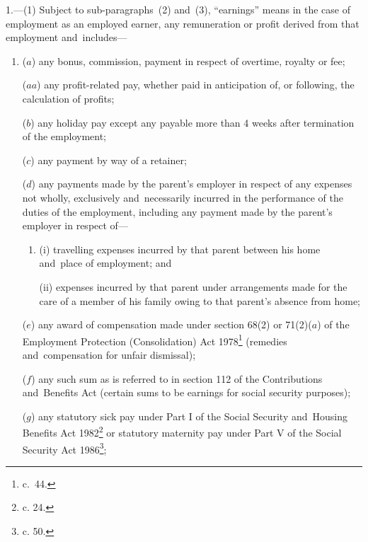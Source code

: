 \documentclass[12pt,a4paper]{article}
\begin{document}
1.—(1) Subject to sub-paragraphs~(2) and~(3), “earnings” means in the case of employment as an employed earner, any remuneration or profit derived from that employment and~includes—
\begin{enumerate}\item[]
($a$) any bonus, commission, 
payment in respect of overtime,  %
royalty or fee;

($aa$) any profit-related pay, whether paid in anticipation of, or following, the calculation of profits;

($b$) any holiday pay except any payable more than 4 weeks after termination of the employment;

($c$) any payment by way of a retainer;


($d$) any payments made by the parent’s employer in respect of any expenses not wholly, exclusively and~necessarily incurred in the performance of the duties of the employment, including any payment made by the parent’s employer in respect of—
\begin{enumerate}\item[]
(i) travelling expenses incurred by that parent between his home and~place of employment; and

(ii) expenses incurred by that parent under arrangements made for the care of a member of his family owing to that parent’s absence from home;
\end{enumerate}

($e$) any award of compensation made under section 68(2) or 71(2)($a$) of the Employment Protection (Consolidation) Act 1978\footnote{ c.~44.} (remedies and~compensation for unfair dismissal);

($f$) any such sum as is referred to in section 112 of the Contributions and~Benefits Act (certain sums to be earnings for social security purposes);

($g$) any statutory sick pay under Part I of the Social Security and~Housing Benefits Act 1982\footnote{ c. 24.} or statutory maternity pay under Part V of the Social Security Act 1986\footnote{ c. 50.};


\end{enumerate}
\end{document}
